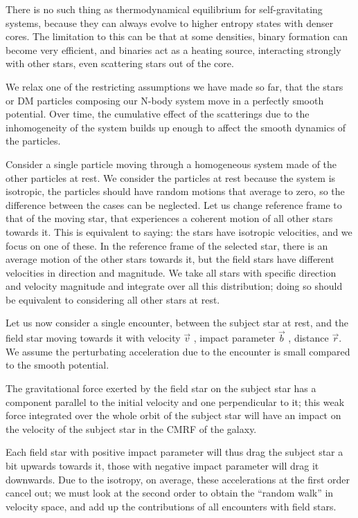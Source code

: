 \documentclass[a4paper,12pt]{article}
\begin{document}
There is no such thing as thermodynamical equilibrium for self-gravitating systems, because they can always evolve to higher entropy states with denser cores. The limitation to this can be that at some densities, binary formation can become very efficient, and binaries act as a heating source, interacting strongly with other stars, even scattering stars out of the core.

We relax one of the restricting assumptions we have made so far, that the stars or DM particles composing our N-body system move in a perfectly smooth potential. Over time, the cumulative effect of the scatterings due to the inhomogeneity of the system builds up enough to affect the smooth dynamics of the particles.

Consider a single particle moving through a homogeneous system made of the other particles at rest. We consider the particles at rest because the system is isotropic, the particles should have random motions that average to zero, so the difference between the cases can be neglected. Let us change reference frame to that of the moving star, that experiences a coherent motion of all other stars towards it.
This is equivalent to saying: the stars have isotropic velocities, and we focus on one of these. In the reference frame of the selected star, there is an average motion of the other stars towards it, but the field stars have different velocities in direction and magnitude. We take all stars with specific direction and velocity magnitude and integrate over all this distribution; doing so should be equivalent to considering all other stars at rest.

Let us now consider a single encounter, between the subject star at rest, and the field star moving towards it with velocity $\vec{v}$ , impact parameter $\vec{b}$ , distance $\vec{r}$. We assume the perturbating acceleration due to the encounter is small compared to the smooth potential.

The gravitational force exerted by the field star on the subject star has a component parallel to the initial velocity and one perpendicular to it; this weak force integrated over the whole orbit of the subject star will have an impact on the velocity of the subject star in the CMRF of the galaxy.

Each field star with positive impact parameter will thus drag the subject star a bit upwards towards it, those with negative impact parameter will drag it downwards. Due to the isotropy, on average, these accelerations at the first order cancel out; we must look at the second order to obtain the “random walk” in velocity space, and add up the contributions of all encounters with field stars.
\end{document}
